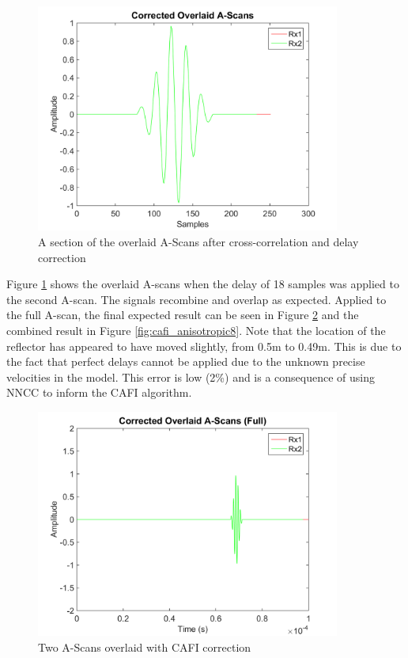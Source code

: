 \begin{figure}[htb]
\centering
		\includegraphics[width=100mm]{Anisotropic_6.png}
		\caption{A section of the overlaid A-Scans after cross-correlation and delay correction}
		\label{fig:cafi_anisotropic6}
\end{figure}


Figure \ref{fig:cafi_anisotropic6} shows the overlaid A-scans when the delay of 18 samples was applied to the second A-scan. The signals recombine and overlap as expected. Applied to the full A-scan, the final expected result can be seen in Figure \ref{fig:cafi_anisotropic7} and the combined result in Figure \ref{fig:cafi_anisotropic8}. Note that the location of the reflector has appeared to have moved slightly, from 0.5m to 0.49m. This is due to the fact that perfect delays cannot be applied due to the unknown precise velocities in the model. This error is low (2\%) and is a consequence of using NNCC to inform the CAFI algorithm.

\begin{figure}[htb]
\centering
		\includegraphics[width=100mm]{Anisotropic_7.png}
		\caption{Two A-Scans overlaid with CAFI correction}
		\label{fig:cafi_anisotropic7}
\end{figure}

